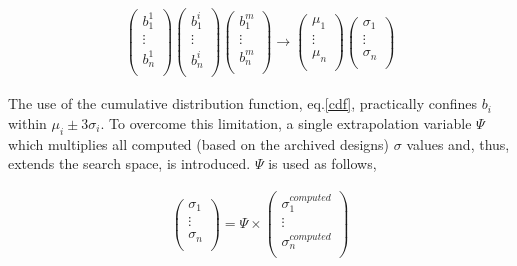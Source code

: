\begin{eqnarray}
		\left( {\begin{array}{c}
 		b_1^1  \\
 		\vdots  \\
 		b_n^1	\\
 		\end{array} } \right) 
 		\left( {\begin{array}{c}
 		b_1^i  \\
 		\vdots  \\
 		b_n^i	\\
 		\end{array} } \right)
 		\left( {\begin{array}{c}
 		b_1^m  \\
 		\vdots  \\
 		b_n^m	\\
 		\end{array} } \right) \rightarrow
		\left( {\begin{array}{c}
 		\mu _1  \\
 		\vdots  \\
 		\mu _n  \\
 		\end{array} } \right)
		\left( {\begin{array}{c}
 		\sigma _1  \\
 		\vdots  \\
 		\sigma _n  \\
 		\end{array} } \right)
   \label{cdf-matrix} 
\end{eqnarray}

The use of the cumulative distribution function, eq.\ref{cdf}, practically confines $b_i$ within $\mu _i \pm 3\sigma _i$. To overcome this limitation, a single extrapolation variable $\Psi$ which multiplies all computed (based on the archived designs) $\sigma$ values and, thus, extends the search space, is introduced. $\Psi$ is used as follows,


\begin{eqnarray}
		\left( {\begin{array}{c}
 		\sigma _1  \\
 		\vdots  \\
 		\sigma _n  \\
 		\end{array} } \right) =
 		\Psi \times 
 		\left( {\begin{array}{c}
 		\sigma _1^{computed}  \\
 		\vdots  \\
 		\sigma _n^{computed}  \\
 		\end{array} } \right)
   \label{cdf-matrix} 
\end{eqnarray}

